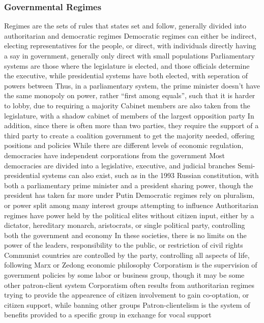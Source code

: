 \documentclass[11 pt, twoside]{article}
\newenvironment{outline*}
{
	\begin{outline}[enumerate]
	}
	{\end{outline}
}
\begin{document}
\subsubsection{Governmental Regimes}
\begin{outline*}
\1 Regimes are the sets of rules that states set and follow, generally divided into authoritarian and democratic regimes
\1 Democratic regimes can either be indirect, electing representatives for the people, or direct, with individuals directly having a say in government, generally only direct with small populations
\2 Parliamentary systems are those where the legislature is elected, and those officials determine the executive, while presidential systems have both elected, with seperation of powers between
\3 Thus, in a parliamentary system, the prime minister doesn't have the same monopoly on power, rather ``first among equals'', such that it is harder to lobby, due to requiring a majority
\3 Cabinet members are also taken from the legislature, with a shadow cabinet of members of the largest opposition party
\3 In addition, since there is often more than two parties, they require the support of a third party to create a coalition government to get the majority needed, offering positions and policies
\2 While there are different levels of economic regulation, democracies have independent corporations from the government
\2 Most democracies are divided into a legislative, executive, and judicial branches
\2 Semi-presidential systems can also exist, such as in the 1993 Russian constitution, with both a parliamentary prime minister and a president sharing power, though the president has taken far more under Putin
\2 Democratic regimes rely on pluralism, or power split among many interest groups attempting to influence
\1 Authoritarian regimes have power held by the political elites without citizen input, either by a dictator, hereditary monarch, aristocrats, or single political party, controlling both the government and economy
\2 In these societies, there is no limits on the power of the leaders, responsibility to the public, or restriction of civil rights
\2 Communist countries are controlled by the party, controlling all aspects of life, following Marx or Zedong economic philosophy
\2 Corporatism is the supervision of government policies by some labor or business group, though it may be some other patron-client system
\3 Corporatism often results from authoritarian regimes trying to provide the appearence of citizen involvement to gain co-optation, or citizen support, while banning other groups 
\3 Patron-clientelism is the system of benefits provided to a specific group in exchange for vocal support

\end{outline*}
\end{document}
